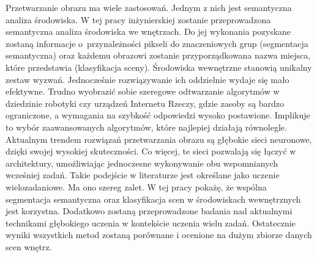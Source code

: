 Przetwarzanie obrazu ma wiele zastosowań. Jednym z nich jest semantyczna analiza środowiska. W tej pracy inżynierskiej zostanie przeprowadzona semantyczna analiza środowiska we wnętrzach. Do jej wykonania pozyskane zostaną informacje o~przynależności pikseli do znaczeniowych grup (segmentacja semantyczna) oraz każdemu obrazowi zostanie przyporządkowana nazwa miejsca, które przedstawia (klasyfikacja sceny). Środowiska wewnętrzne stanowią unikalny zestaw wyzwań. Jednocześnie rozwiązywanie ich oddzielnie wydaje się mało efektywne. Trudno wyobrazić sobie szeregowe odtwarzanie algorytmów w dziedzinie robotyki czy urządzeń Internetu Rzeczy, gdzie zasoby są bardzo ograniczone, a wymagania na szybkość odpowiedzi wysoko postawione. Implikuje to wybór zaawansowanych algorytmów, które najlepiej działają równolegle. Aktualnym trendem rozwiązań przetwarzania obrazu są głębokie sieci neuronowe, dzięki swojej wysokiej skuteczności. Co więcej, te sieci pozwalają się łączyć w architektury, umożliwiając jednoczesne wykonywanie obu wspomnianych wcześniej zadań. Takie podejście w literaturze jest określane jako uczenie wielozadaniowe. Ma ono szereg zalet. W tej pracy pokażę, że wspólna segmentacja semantyczna oraz klasyfikacja scen w środowiskach wewnętrznych jest korzystna. Dodatkowo zostaną przeprowadzone badania nad aktualnymi technikami głębokiego uczenia w kontekście uczenia wielu zadań. Ostatecznie wyniki wszystkich metod zostaną porównane i ocenione na dużym zbiorze danych scen wnętrz.



